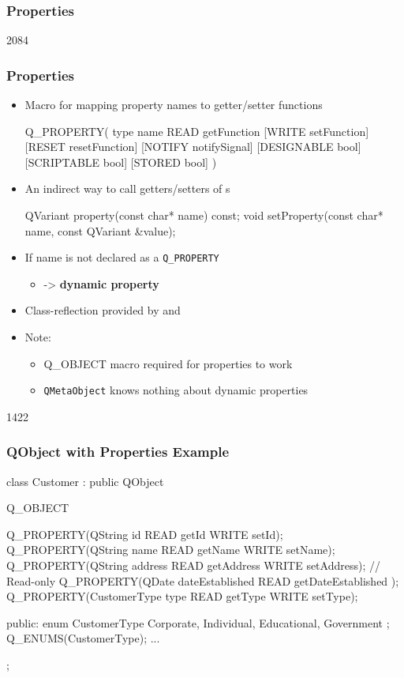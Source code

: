 \subsubsection{Properties}
\begin{slide}[fragile]{2084}
\frametitle{Properties}
\begin{itemize}
  \item Macro for mapping property names to getter/setter functions
\begin{cpp}
  Q_PROPERTY( type name READ getFunction [WRITE setFunction]
  [RESET resetFunction] [NOTIFY notifySignal] [DESIGNABLE bool]
  [SCRIPTABLE bool] [STORED bool] )
\end{cpp}
  \vspace*{0.5em}
  \item An indirect way to call getters/setters of s
\begin{cpp}
  QVariant property(const char* name) const;
  void setProperty(const char* name, const QVariant &value);
\end{cpp}
  \vspace*{0.5em}
  \item If name is not declared as a \texttt{Q\_PROPERTY}
  \begin{itemize}
    \item[] -> \textbf{dynamic property}
  \end{itemize}
  \vspace*{0.5em}
  \item Class-reflection provided by  and 
  \vspace*{0.5em}
  \item Note:
  \begin{itemize}
    \item Q\_OBJECT macro required for properties to work
    \item \texttt{QMetaObject} knows nothing about dynamic properties
  \end{itemize}
\end{itemize}
\end{slide}

\begin{slide}[fragile]{1422}
\frametitle{QObject with Properties Example}
\begin{cpp}
class Customer : public QObject
{
    Q_OBJECT

    Q_PROPERTY(QString id READ getId WRITE setId);
    Q_PROPERTY(QString name READ getName WRITE setName);
    Q_PROPERTY(QString address READ getAddress WRITE setAddress);
    // Read-only
    Q_PROPERTY(QDate dateEstablished READ getDateEstablished );
    Q_PROPERTY(CustomerType type READ getType WRITE setType);

  public:
    enum CustomerType {
      Corporate, Individual, Educational, Government
    };
    Q_ENUMS(CustomerType);
    ...
};
\end{cpp}
\end{slide}

